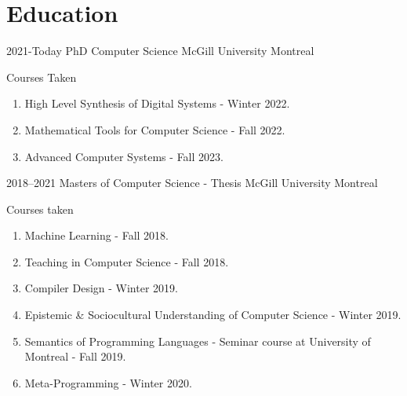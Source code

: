
\section{Education}

    \cventry
        {2021-Today}
        {PhD Computer Science}
        {McGill University}
        {Montreal}
        {}
        {
        {
            Courses Taken
            \begin{multicols}{2}
                \begin{enumerate}
                  \item High Level Synthesis of Digital Systems - Winter 2022.
                  \item Mathematical Tools for Computer Science - Fall 2022.
                  \item Advanced Computer Systems - Fall 2023.
                \end{enumerate}
            \end{multicols}
              }
    }  %

    \cventry
        {2018--2021}
        {Masters of Computer Science - Thesis}
        {McGill University}
        {Montreal}
        {}
        {
            Courses taken
            \begin{multicols}{2}
                \begin{enumerate}
                  \item Machine Learning - Fall 2018.
                  \item Teaching in Computer Science - Fall 2018.
                  \item Compiler Design - Winter 2019.
                  \item Epistemic \& Sociocultural Understanding of Computer Science - Winter 2019. 
                  \item Semantics of Programming Languages - Seminar course at University of Montreal - Fall 2019.
                  \item Meta-Programming - Winter 2020.
                \end{enumerate}
            \end{multicols}      
        }  %
    
